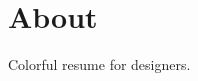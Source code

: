 \documentclass[11pt]{article}
\begin{document}
\\
\vspace{2mm}
\section*{About}
Colorful resume for designers.
\end{document}
